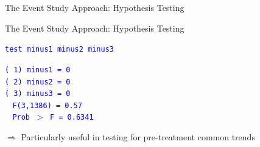 \documentclass[10pt,xcolor=table,ignorenonframetext,handout,aspectratio=169]{beamer}
\begin{document}
\begin{frame}{The Event Study Approach:  Hypothesis Testing}

\begin{center}
\end{center}

\end{frame}




\begin{frame}{The Event Study Approach:  Hypothesis Testing}

\begin{small}
\textcolor{blue}{\texttt{test minus1 minus2 minus3}} \\

\medskip

\textcolor{blue}{\texttt{( 1)  minus1 = 0}} \\
\textcolor{blue}{\texttt{( 2)  minus2 = 0}} \\
\textcolor{blue}{\texttt{( 3)  minus3 = 0}} \\

\medskip
\textcolor{blue}{\texttt{$\ \ \ \ $F(3,1386) =    0.57}} \\
\textcolor{blue}{\texttt{$\ \ \ \ $Prob $>$ F =    0.6341}} 

\end{small}

\medskip
\medskip

$\Rightarrow$ Particularly useful in testing for pre-treatment common trends
\end{frame}
\end{document}
